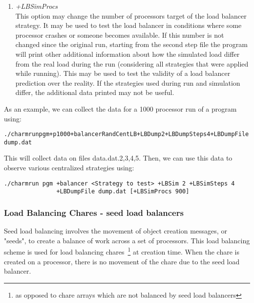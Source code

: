 \begin{enumerate}
	Default value is 1.
\item {\em +LBSimProcs}\\
        This option may change the number of processors target of the load balancer strategy. It may be used to test
	the load balancer in conditions where some processor crashes or someone becomes available. If this number is not
	changed since the original run, starting from the second step file the program will print other additional
	information about how the simulated load differ from the real load during the run (considering all
	strategies that were applied while running). This may be used to test the validity of a load balancer
	prediction over the reality. If the strategies used during run and simulation differ, the additional data
	printed may not be useful.
\end{enumerate}
As an example, we can collect the data for a 1000 processor run of a program using:
\begin{alltt}
./charmrun pgm +p 1000 +balancer RandCentLB +LBDump 2 +LBDumpSteps 4 +LBDumpFile dump.dat
\end{alltt}
This will collect data on files data.dat.{2,3,4,5}. Then, we can use this data to observe various centralized strategies using:
\begin{verbatim}
./charmrun pgm +balancer <Strategy to test> +LBSim 2 +LBSimSteps 4 
               +LBDumpFile dump.dat [+LBSimProcs 900]
\end{verbatim}


\subsubsection{Load Balancing Chares - seed load balancers}
\label{seedlb}

Seed load balancing involves the movement of object creation messages, or 
"seeds", to create a balance of work across a set of processors. 
This load balancing scheme is used for load balancing 
chares~\footnote{as opposed to chare arrays which are not balanced by seed load balancers}
 at creation time. 
When the chare is created on a processor, there is no movement of the chare
due to the seed load balancer. 

